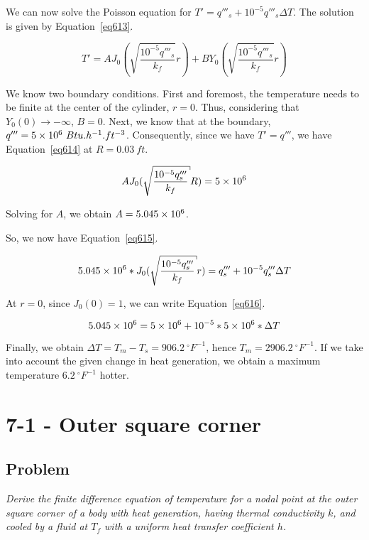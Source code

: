 We can now solve the Poisson equation for $T' = q'''_s + 10^{-5}q'''_s\Delta T$. The solution is given by Equation~\ref{eq613}.


\begin{equation}\label{eq613}
T' = AJ_0(\sqrt{\frac{10^{-5}q'''_s}{k_f}} r) + BY_0(\sqrt{\frac{10^{-5}q'''_s}{k_f}} r)
\end{equation}

We know two boundary conditions. First and foremost, the temperature needs to be finite at the center of the cylinder, $r=0$. Thus, considering that $Y_0(0) \rightarrow -\infty$, $B=0$. Next, we know that at the boundary, $q''' = \text{\num{5e6}}\ Btu.h^{-1}.ft^{-3}$. Consequently, since we have $T' = q'''$, we have Equation~\ref{eq614} at $R = 0.03\ ft$.


\begin{equation}\label{eq614}
AJ_0(\sqrt{\frac{10^{-5}q'''_s}{k_f}} R) = \text{\num{5e6}}
\end{equation}

Solving for $A$, we obtain $A = \text{\num{5.045e6}}$.

So, we now have Equation~\ref{eq615}.


\begin{equation}\label{eq615}
\text{\num{5.045e6}} * J_0(\sqrt{\frac{10^{-5}q'''_s}{k_f}} r) = q'''_s + 10^{-5}q'''_s\Delta T
\end{equation}

At $r=0$, since $J_0(0) = 1$, we can write Equation~\ref{eq616}.

\begin{equation}\label{eq616}
\text{\num{5.045e6}} = \text{\num{5e6}} + 10^{-5} * \text{\num{5e6}} * \Delta T
\end{equation}

Finally, we obtain $\Delta T = T_m - T_s = 906.2\ {}^\circ F^{-1}$, hence $T_m = 2906.2\ {}^\circ F^{-1}$. If we take into account the given change in heat generation, we obtain a maximum temperature $6.2\ {}^\circ F^{-1}$ hotter.

\section{7-1 - Outer square corner}
\label{prob62}

\subsection{Problem}
\textit{Derive the finite difference equation of temperature for a nodal point at the outer square corner of a body with heat generation, having thermal conductivity $k$, and cooled by a fluid at $T_f$ with a uniform heat transfer coefficient $h$.}

